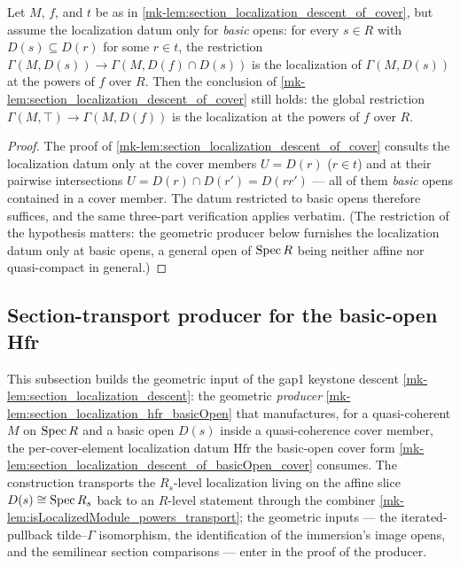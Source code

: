\begin{lemma}
  \label{mk-lem:section_localization_descent_of_basicOpen_cover}
  \leanok

  Let \(M\), \(f\), and \(t\) be as in \ref{mk-lem:section_localization_descent_of_cover},
  but assume the localization datum only for \emph{basic} opens: for every \(s \in R\)
  with \(D(s) \subseteq D(r)\) for some \(r \in t\), the restriction
  \(\Gamma(M, D(s)) \to \Gamma(M, D(f) \cap D(s))\) is the localization of
  \(\Gamma(M, D(s))\) at the powers of \(f\) over \(R\). Then the conclusion of
  \ref{mk-lem:section_localization_descent_of_cover} still holds: the global restriction
  \(\Gamma(M, \top) \to \Gamma(M, D(f))\) is the localization at the powers of \(f\)
  over \(R\).
\end{lemma}
\begin{proof}
  \leanok
  The proof of \ref{mk-lem:section_localization_descent_of_cover} consults the
  localization datum only at the cover members \(U = D(r)\) (\(r \in t\)) and at their
  pairwise intersections \(U = D(r) \cap D(r') = D(r r')\) — all of them \emph{basic}
  opens contained in a cover member. The datum restricted to basic opens therefore
  suffices, and the same three-part verification applies verbatim. (The restriction of
  the hypothesis matters: the geometric producer below furnishes the localization datum
  only at basic opens, a general open of \(\operatorname{Spec} R\) being neither affine nor
  quasi-compact in general.)
\end{proof}


\subsection{Section-transport producer for the basic-open Hfr}

This subsection builds the geometric input of the gap1 keystone descent
\ref{mk-lem:section_localization_descent}: the geometric \emph{producer}
\ref{mk-lem:section_localization_hfr_basicOpen} that manufactures, for a quasi-coherent \(M\) on
\(\operatorname{Spec} R\) and a basic open \(D(s)\) inside a quasi-coherence cover member, the per-cover-element
localization datum \(\mathrm{Hfr}\) the basic-open cover form
\ref{mk-lem:section_localization_descent_of_basicOpen_cover} consumes. The construction transports the
\(R_s\)-level localization living on the affine slice \(D(s) \cong \operatorname{Spec} R_s\) back to an
\(R\)-level statement through the combiner \ref{mk-lem:isLocalizedModule_powers_transport}; the
geometric inputs --- the iterated-pullback tilde--\(\Gamma\) isomorphism, the identification of the
immersion's image opens, and the semilinear section comparisons --- enter in the proof of the
producer.

